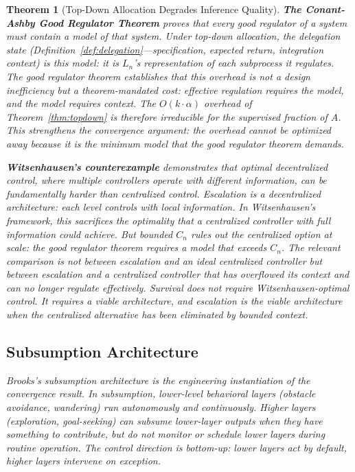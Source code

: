 \documentclass[11pt]{article}
\newtheorem{theorem}{Theorem}
\theoremstyle{definition}
\begin{document}
\begin{theorem}[Top-Down Allocation Degrades Inference Quality]
\textbf{The Conant-Ashby Good Regulator Theorem} \cite{ConantAshby1970}
proves that every good regulator of a system must contain a model of
that system. Under top-down allocation, the delegation state
(Definition~\ref{def:delegation}---specification, expected return,
integration context) \emph{is} this model: it is $L_n$'s
representation of each subprocess it regulates. The good regulator
theorem establishes that this overhead is not a design inefficiency but
a \emph{theorem-mandated cost}: effective regulation requires the model,
and the model requires context. The $O(k \cdot \alpha)$ overhead of
Theorem~\ref{thm:topdown} is therefore irreducible for the supervised
fraction of $A$. This strengthens the convergence argument: the
overhead cannot be optimized away because it is the minimum model
that the good regulator theorem demands.

\textbf{Witsenhausen's counterexample} \cite{Witsenhausen1968}
demonstrates that optimal decentralized control, where multiple
controllers operate with different information, can be fundamentally
harder than centralized control. Escalation is a decentralized
architecture: each level controls with local information. In
Witsenhausen's framework, this sacrifices the optimality that a
centralized controller with full information could achieve. But
bounded $C_n$ rules out the centralized option at scale: the good
regulator theorem requires a model that exceeds $C_n$. The relevant
comparison is not between escalation and an ideal centralized
controller but between escalation and a centralized controller that
has overflowed its context and can no longer regulate effectively.
Survival does not require Witsenhausen-optimal control. It requires
a viable architecture, and escalation is the viable architecture when
the centralized alternative has been eliminated by bounded context.

\subsection{Subsumption Architecture}

Brooks's subsumption architecture \cite{Brooks1986} is the engineering
instantiation of the convergence result. In subsumption, lower-level
behavioral layers (obstacle avoidance, wandering) run autonomously and
continuously. Higher layers (exploration, goal-seeking) can subsume
lower-layer outputs when they have something to contribute, but do not
monitor or schedule lower layers during routine operation. The control
direction is bottom-up: lower layers act by default, higher layers
intervene on exception.


\end{theorem}
\end{document}
